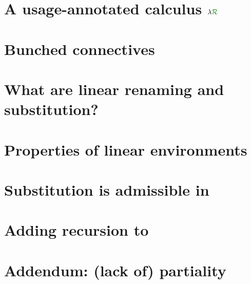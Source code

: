\section{A usage-annotated calculus $\name$}\label{sec:lr}

\section{Bunched connectives}\label{sec:lnd}

\section{What are linear renaming and substitution?}\label{sec:lrkits}

\section{Properties of linear environments}\label{sec:lenv}

\section{Substitution is admissible in \name{}}\label{sec:lrsub}

\section{Adding recursion to \name{}}\label{sec:rec}

\section{Addendum: (lack of) partiality}\label{sec:part}


